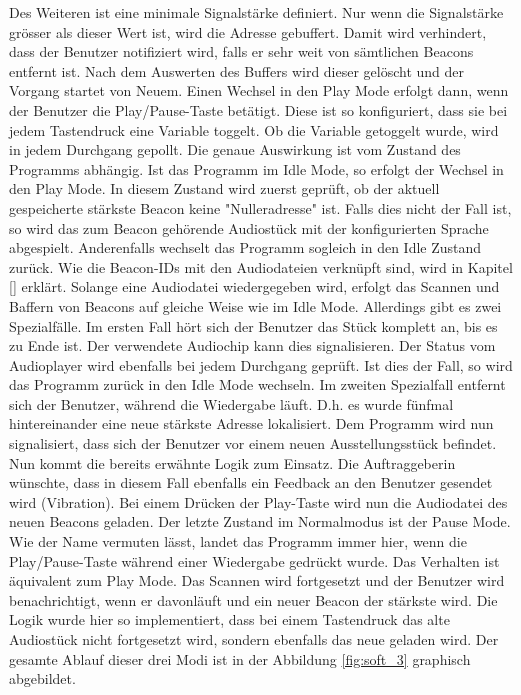 Des Weiteren ist eine minimale Signalstärke definiert. Nur wenn die Signalstärke grösser als dieser Wert ist, wird die Adresse gebuffert. Damit wird verhindert, dass der Benutzer notifiziert wird, falls er sehr weit von sämtlichen Beacons entfernt ist.
Nach dem Auswerten des Buffers wird dieser gelöscht und der Vorgang startet von Neuem. Einen Wechsel in den Play Mode erfolgt dann, wenn der Benutzer die Play/Pause-Taste betätigt. Diese ist so konfiguriert, dass sie bei jedem Tastendruck eine Variable toggelt. Ob die Variable getoggelt wurde, wird in jedem Durchgang gepollt. Die genaue Auswirkung ist vom Zustand des Programms abhängig. Ist das Programm im Idle Mode, so erfolgt der Wechsel in den Play Mode.
In diesem Zustand wird zuerst geprüft, ob der aktuell gespeicherte stärkste Beacon keine "Nulleradresse" ist. Falls dies nicht der Fall ist, so wird das zum Beacon gehörende Audiostück mit der konfigurierten Sprache abgespielt. Anderenfalls wechselt das Programm sogleich in den Idle Zustand zurück. Wie die Beacon-IDs mit den Audiodateien verknüpft sind, wird in Kapitel \ref{} erklärt.
Solange eine Audiodatei wiedergegeben wird, erfolgt das Scannen und Baffern von Beacons auf gleiche Weise wie im Idle Mode. Allerdings gibt es zwei Spezialfälle. Im ersten Fall hört sich der Benutzer das Stück komplett an, bis es zu Ende ist. Der verwendete Audiochip kann dies signalisieren. Der Status vom Audioplayer wird ebenfalls bei jedem Durchgang geprüft. Ist dies der Fall, so wird das Programm zurück in den Idle Mode wechseln. Im zweiten Spezialfall entfernt sich der Benutzer, während die Wiedergabe läuft. D.h. es wurde fünfmal hintereinander eine neue stärkste Adresse lokalisiert. Dem Programm wird nun signalisiert, dass sich der Benutzer vor einem neuen Ausstellungsstück befindet. Nun kommt die bereits erwähnte Logik zum Einsatz. Die Auftraggeberin wünschte, dass in diesem Fall ebenfalls ein Feedback an den Benutzer gesendet wird (Vibration). Bei einem Drücken der Play-Taste wird nun die Audiodatei des neuen Beacons geladen.
Der letzte Zustand im Normalmodus ist der Pause Mode. Wie der Name vermuten lässt, landet das Programm immer hier, wenn die Play/Pause-Taste während einer Wiedergabe gedrückt wurde. Das Verhalten ist äquivalent zum Play Mode. Das Scannen wird fortgesetzt und der Benutzer wird benachrichtigt, wenn er davonläuft und ein neuer Beacon der stärkste wird. Die Logik wurde hier so implementiert, dass bei einem Tastendruck das alte Audiostück nicht fortgesetzt wird, sondern ebenfalls das neue geladen wird. 
Der gesamte Ablauf dieser drei Modi ist in der Abbildung \ref{fig:soft_3} graphisch abgebildet.
